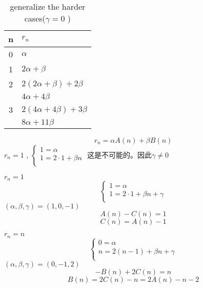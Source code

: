 \documentclass[mode=geye]{elegantnote}
\begin{document}
\begin{table}[htbp]
	\centering
	\small
	\caption{generalize the harder cases($ \gamma = 0 $ )}
	\begin{tabular}{cl}
		\toprule
		n & $ r_n $ \\
		\midrule
        0 & $ \alpha $  \\
        1 & $ 2\alpha+\beta $  \\
        2 & $ 2(2\alpha+\beta)+2\beta $  \\
          & $ 4\alpha + 4\beta $ \\
        3 & $ 2(4\alpha + 4\beta)+3\beta $  \\
          & $ 8\alpha + 11\beta $ \\
		\bottomrule
	\end{tabular}%
	\label{tab:casesofharderChange002}%
\end{table}%
\begin{equation*}
    r_n = \alpha A(n)+\beta B(n)
\end{equation*}
$ r_n=1 $ , $ \left\{\begin{array}{l}
    1=\alpha\\
    1=2\cdot 1+\beta n\\
\end{array}\right. $ 
这是不可能的。因此$ \gamma \neq 0 $ 

$ r_n=1 $ 
\begin{equation*}
    \left\{
        \begin{array}{l}
            1=\alpha\\
            1=2\cdot 1+\beta n + \gamma\\
        \end{array}
    \right.
\end{equation*}
$ (\alpha, \beta, \gamma) = (1,0,-1) $ 
\begin{equation*}
    A(n)-C(n)=1
\end{equation*}
\begin{equation*}
    C(n)=A(n)-1    
\end{equation*}

$ r_n = n $ 
\begin{equation*}
    \left\{
        \begin{array}{l}
            0=\alpha\\
            n=2(n-1) + \beta n + \gamma\\
        \end{array}
    \right.
\end{equation*}
$ (\alpha, \beta, \gamma) = (0,-1,2) $ 
\begin{equation*}
    -B(n)+2C(n)=n
\end{equation*}
\begin{equation*}
    B(n)=2C(n)-n = 2A(n)-n-2
\end{equation*}
\end{document}
